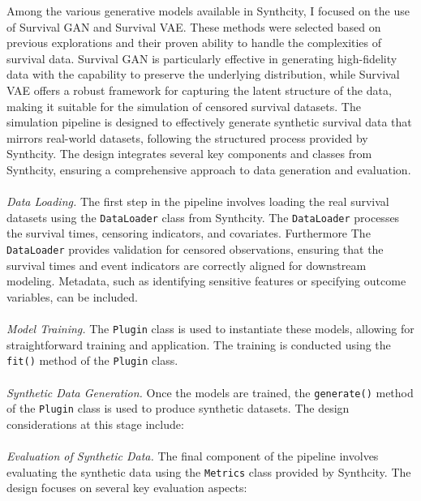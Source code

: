 \noindent Among the various generative models available in Synthcity, I focused on the use of Survival GAN and Survival VAE. These methods were selected based on previous explorations and their proven ability to handle the complexities of survival data. Survival GAN is particularly effective in generating high-fidelity data with the capability to preserve the underlying distribution, while Survival VAE offers a robust framework for capturing the latent structure of the data, making it suitable for the simulation of censored survival datasets.
The simulation pipeline is designed to effectively generate synthetic survival data that mirrors real-world datasets, following the structured process provided by Synthcity. The design integrates several key components and classes from Synthcity, ensuring a comprehensive approach to data generation and evaluation.
\\\\
\noindent \textit{Data Loading.} \parencite{qian_synthcity_2023} The first step in the pipeline involves loading the real survival datasets using the \texttt{DataLoader} class from Synthcity. The \texttt{DataLoader} processes the survival times, censoring indicators, and covariates. Furthermore The \texttt{DataLoader} provides validation for censored observations, ensuring that the survival times and event indicators are correctly aligned for downstream modeling. Metadata, such as identifying sensitive features or specifying outcome variables, can be included.
\\\\
\noindent \textit{Model Training.} The \texttt{Plugin} class is used to instantiate these models, allowing for straightforward training and application. The training is conducted using the \texttt{fit()} method of the \texttt{Plugin} class.
\\\\
\noindent \textit{Synthetic Data Generation.} Once the models are trained, the \texttt{generate()} method of the \texttt{Plugin} class is used to produce synthetic datasets. The design considerations at this stage include:
\\\\
\noindent \textit{Evaluation of Synthetic Data.} The final component of the pipeline involves evaluating the synthetic data using the \texttt{Metrics} class provided by Synthcity. The design focuses on several key evaluation aspects:
